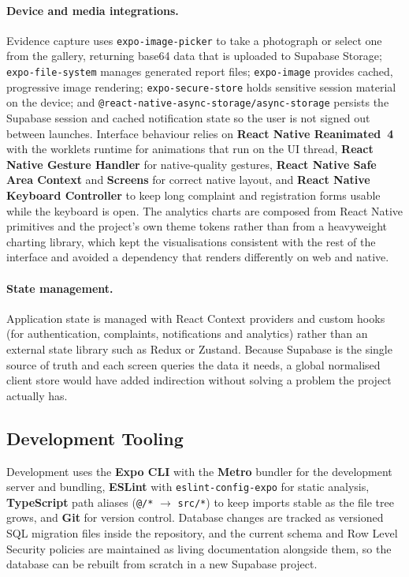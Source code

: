 \documentclass[11pt,a4paper]{article}
\newcommand{\code}[1]{\texttt{\small #1}}
\begin{document}
\paragraph{Device and media integrations.} Evidence capture uses
\code{expo-image-picker} to take a photograph or select one from the gallery,
returning base64 data that is uploaded to Supabase Storage;
\code{expo-file-system} manages generated report files; \code{expo-image}
provides cached, progressive image rendering; \code{expo-secure-store} holds
sensitive session material on the device; and
\code{@react-native-async-storage/async-storage} persists the Supabase session
and cached notification state so the user is not signed out between launches.
Interface behaviour relies on \textbf{React Native Reanimated~4} with the
worklets runtime for animations that run on the UI thread, \textbf{React Native
Gesture Handler} for native-quality gestures, \textbf{React Native Safe Area
Context} and \textbf{Screens} for correct native layout, and \textbf{React Native
Keyboard Controller} to keep long complaint and registration forms usable while
the keyboard is open. The analytics charts are composed from React Native
primitives and the project's own theme tokens rather than from a heavyweight
charting library, which kept the visualisations consistent with the rest of the
interface and avoided a dependency that renders differently on web and native.

\paragraph{State management.} Application state is managed with React Context
providers and custom hooks (for authentication, complaints, notifications and
analytics) rather than an external state library such as Redux or Zustand.
Because Supabase is the single source of truth and each screen queries the data it
needs, a global normalised client store would have added indirection without
solving a problem the project actually has.

\subsection{Development Tooling}

Development uses the \textbf{Expo CLI} with the \textbf{Metro} bundler for the
development server and bundling, \textbf{ESLint} with \code{eslint-config-expo}
for static analysis, \textbf{TypeScript} path aliases (\code{@/*}
$\rightarrow$ \code{src/*}) to keep imports stable as the file tree grows, and
\textbf{Git} for version control. Database changes are tracked as versioned SQL
migration files inside the repository, and the current schema and Row Level
Security policies are maintained as living documentation alongside them, so the
database can be rebuilt from scratch in a new Supabase project.
\end{document}
